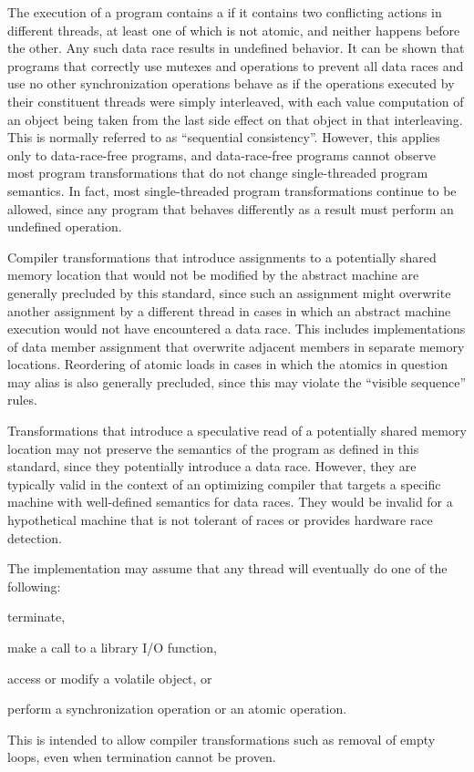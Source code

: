 \pnum
The execution of a program contains a  if it contains two
conflicting actions in different threads, at least one of which is not atomic,
and neither happens before the other. Any such data race results in undefined
behavior. \enternote It can be shown that programs that correctly use mutexes
and  operations to prevent all data races and use no
other synchronization operations behave as if the operations executed by their
constituent threads were simply interleaved, with each
%
value computation of an
object being taken from the last
%
side effect on that object in that
interleaving. This is normally referred to as ``sequential consistency''.
However, this applies only to data-race-free programs, and data-race-free
programs cannot observe most program transformations that do not change
single-threaded program semantics. In fact, most single-threaded program
transformations continue to be allowed, since any program that behaves
differently as a result must perform an undefined operation. \exitnote

\pnum
\enternote Compiler transformations that introduce assignments to a potentially
shared memory location that would not be modified by the abstract machine are
generally precluded by this standard, since such an assignment might overwrite
another assignment by a different thread in cases in which an abstract machine
execution would not have encountered a data race. This includes implementations
of data member assignment that overwrite adjacent members in separate memory
locations. Reordering of atomic loads in cases in which the atomics in question
may alias is also generally precluded, since this may violate the ``visible
sequence'' rules. \exitnote

\pnum
\enternote Transformations that introduce a speculative read of a potentially
shared memory location may not preserve the semantics of the \Cpp program as
defined in this standard, since they potentially introduce a data race. However,
they are typically valid in the context of an optimizing compiler that targets a
specific machine with well-defined semantics for data races. They would be
invalid for a hypothetical machine that is not tolerant of races or provides
hardware race detection. \exitnote

\pnum
The implementation may assume that any thread will eventually do one of the 
following:

\begin{compactitem}
\item 
terminate,

\item
make a call to a library I/O function,

\item
access or modify a volatile object, or

\item
perform a synchronization operation or an atomic operation.
\end{compactitem}
%
\enternote This is intended to allow compiler transformations such as removal of
empty loops, even when termination cannot be proven. \exitnote

